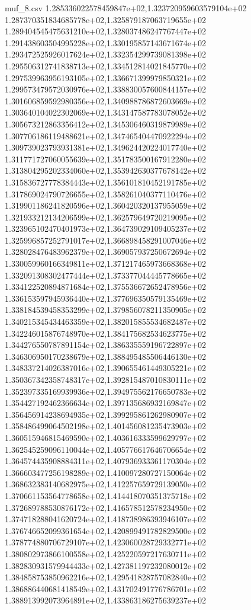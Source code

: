 \begin{filecontents*}{muf_8.csv}
1.285336022578459847e+02,1.323720959603579104e+02
1.287370351834685778e+02,1.325879187063719655e+02
1.289404545475631210e+02,1.328037486247767447e+02
1.291438603504995228e+02,1.330195857143671674e+02
1.293472525926017624e+02,1.332354299739081398e+02
1.295506312741838713e+02,1.334512814021845770e+02
1.297539963956193105e+02,1.336671399979850321e+02
1.299573479572030976e+02,1.338830057600844157e+02
1.301606859592980356e+02,1.340988786872603669e+02
1.303640104022302069e+02,1.343147587783078052e+02
1.305673212863356412e+02,1.345306460319879989e+02
1.307706186119488621e+02,1.347465404470922294e+02
1.309739023793931381e+02,1.349624420224017740e+02
1.311771727060055639e+02,1.351783500167912280e+02
1.313804295202334060e+02,1.353942630377678142e+02
1.315836727778384443e+02,1.356101810452191785e+02
1.317869024790726655e+02,1.358261040377110476e+02
1.319901186241820596e+02,1.360420320137955059e+02
1.321933212134206599e+02,1.362579649720219095e+02
1.323965102470401973e+02,1.364739029109405237e+02
1.325996857252791017e+02,1.366898458291007046e+02
1.328028476483962379e+02,1.369057937250672694e+02
1.330059960166349811e+02,1.371217465973668368e+02
1.332091308302477444e+02,1.373377044445778665e+02
1.334122520894871684e+02,1.375536672652478956e+02
1.336153597945936440e+02,1.377696350579135469e+02
1.338184539458353299e+02,1.379856078211350905e+02
1.340215345434463359e+02,1.382015855534682487e+02
1.342246015876748970e+02,1.384175682534623775e+02
1.344276550787891154e+02,1.386335559196722897e+02
1.346306950170238679e+02,1.388495485506446130e+02
1.348337214026387016e+02,1.390655461449305221e+02
1.350367342358748317e+02,1.392815487010830111e+02
1.352397335169939936e+02,1.394975562176650783e+02
1.354427192462366634e+02,1.397135686932169847e+02
1.356456914238694935e+02,1.399295861262980907e+02
1.358486499064502198e+02,1.401456081235473903e+02
1.360515946815469590e+02,1.403616333599629797e+02
1.362545259096110044e+02,1.405776617646706654e+02
1.364574435908884311e+02,1.407936933361170304e+02
1.366603477256198289e+02,1.410097280727150064e+02
1.368632383140682975e+02,1.412257659729139050e+02
1.370661153564778658e+02,1.414418070351375718e+02
1.372689788530876172e+02,1.416578512578234950e+02
1.374718288041620724e+02,1.418738986393946107e+02
1.376746652099361654e+02,1.420899491782829500e+02
1.378774880706729107e+02,1.423060028729332771e+02
1.380802973866100558e+02,1.425220597217630711e+02
1.382830931579944433e+02,1.427381197232080012e+02
1.384858753850962216e+02,1.429541828757082840e+02
1.386886440681418549e+02,1.431702491776786701e+02
1.388913992073964891e+02,1.433863186275639237e+02

\end{filecontents*}
